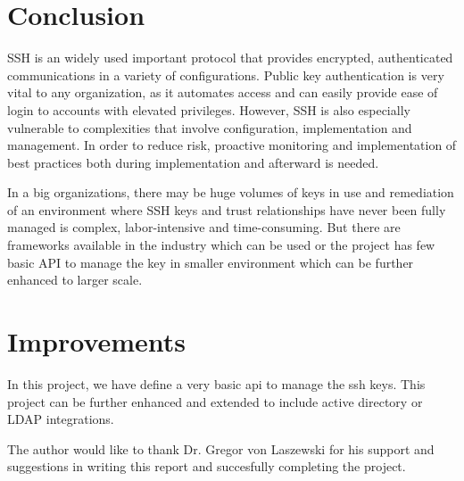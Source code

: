 \section{Conclusion}
SSH is an widely used important protocol that provides encrypted, 
authenticated communications in a variety of configurations. Public key
authentication is very vital to any organization, as it automates 
access and can easily provide ease of login to accounts with elevated 
privileges. However, SSH is also especially vulnerable to complexities
that involve configuration, implementation and management. In order to
reduce risk, proactive monitoring and implementation of best practices 
both during implementation and afterward is needed. 

In a big organizations, there may be huge volumes of keys in use and
remediation of an environment where SSH keys and trust relationships 
have never been fully managed is complex, labor-intensive and 
time-consuming. But there are frameworks available in the industry which 
can be used or the project has few basic API to manage the key in smaller 
environment which can be further enhanced to larger scale.

\section{Improvements}
In this project, we have define a very basic api to manage the ssh keys.
This project can be further enhanced and extended to include active directory 
or LDAP integrations.

\begin{acks}
The author would like to thank Dr. Gregor von Laszewski for his support and 
suggestions in writing this report and succesfully completing the project.
\end{acks}










